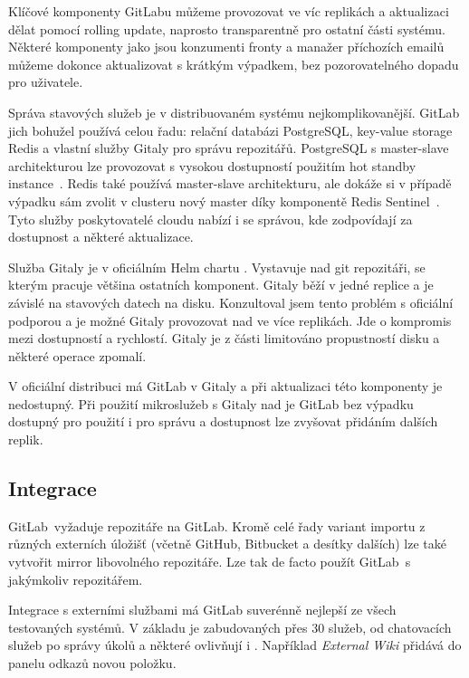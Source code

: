             Klíčové komponenty GitLabu můžeme provozovat ve víc replikách a aktualizaci dělat pomocí rolling update, naprosto transparentně pro ostatní části systému. Některé komponenty jako jsou konzumenti fronty a manažer příchozích emailů můžeme dokonce aktualizovat s krátkým výpadkem, bez pozorovatelného dopadu pro uživatele.

            Správa stavových služeb je v distribuovaném systému nejkomplikovanější. GitLab jich bohužel používá celou řadu: relační databázi PostgreSQL, key-value storage Redis a vlastní služby Gitaly pro správu repozitářů. PostgreSQL s master-slave architekturou lze provozovat s vysokou dostupností použitím hot standby instance~\cite{kim-postgres}. Redis také používá master-slave architekturu, ale dokáže si v případě výpadku sám zvolit v clusteru nový master díky komponentě Redis Sentinel~\cite{redis-ha}. Tyto služby poskytovatelé cloudu nabízí i se správou, kde zodpovídají za dostupnost a některé aktualizace.

            Služba Gitaly je v oficiálním Helm chartu . Vystavuje   nad git repozitáři, se kterým pracuje většina ostatních komponent. Gitaly běží v jedné replice a je závislé na stavových datech na disku. Konzultoval jsem tento problém s oficiální podporou a je možné Gitaly provozovat nad  ve více replikách. Jde o kompromis mezi dostupností a rychlostí. Gitaly je z části limitováno propustností disku a  některé operace zpomalí.

            V oficiální distribuci má GitLab  v Gitaly a při aktualizaci této komponenty je nedostupný. Při použití mikroslužeb s Gitaly nad  je GitLab bez výpadku dostupný pro použití i pro správu a dostupnost lze zvyšovat přidáním dalších replik.

    \subsection{Integrace}
        GitLab~\CI vyžaduje repozitáře na GitLab. Kromě celé řady variant importu z různých externích úložišť (včetně GitHub, Bitbucket a desítky dalších) lze také vytvořit mirror libovolného repozitáře. Lze tak de facto použít GitLab~\CI s jakýmkoliv repozitářem.

        Integrace s externími službami má GitLab suverénně nejlepší ze všech testovaných systémů. V základu je zabudovaných přes 30 služeb, od chatovacích služeb po správy úkolů a některé ovlivňují i . Například \textit{External Wiki} přidává do panelu odkazů novou položku.

